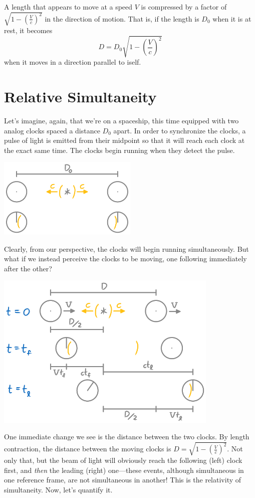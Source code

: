 \documentclass[10pt,a4paper,oneside]{book}
\begin{document}
\begin{summary}
    A length that appears to move at a speed $V$ is compressed by a factor of $\sqrt{1 - \left( \frac{V}{c} \right)^2}$ in the direction of motion.
    That is, if the length is $D_0$ when it is at rest, it becomes
    \[ D = D_0 \sqrt{1 - \left( \frac{V}{c} \right)^2} \]
    when it moves in a direction parallel to iself.
\end{summary}
\pagebreak

\section{Relative Simultaneity}
Let's imagine, again, that we're on a spaceship, this time equipped with two analog clocks spaced a distance $D_0$ apart.
In order to synchronize the clocks, a pulse of light is emitted from their midpoint so that it will reach each clock at the exact same time.
The clocks begin running when they detect the pulse.
\begin{center}
    \includegraphics[width=0.5\textwidth]{restClockSync.png}
\end{center}
Clearly, from our perspective, the clocks will begin running simultaneously.
But what if we instead perceive the clocks to be moving, one following immediately after the other?
\begin{center}
    \includegraphics[width=0.8\textwidth]{movingClockSync.png}
\end{center}
One immediate change we see is the distance between the two clocks.
By length contraction, the distance between the moving clocks is $D = \sqrt{1 - \left( \frac{V}{c} \right)^2}$.
Not only that, but the beam of light will obviously reach the following (left) clock first, and \textit{then} the leading (right) one---these events, although simultaneous in one reference frame, are not simultaneous in another!
This is the relativity of simultaneity.
Now, let's quantify it.
\end{document}
